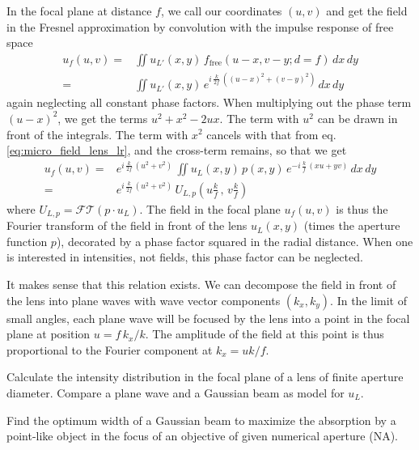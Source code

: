 In the focal plane at distance $f$, we call our coordinates $(u,v)$ and get the field in the Fresnel approximation by convolution with the impulse response of free space
\begin{align}
    u_f(u,v) = & \iint  u_{L'}(x,y) \, f_\text{free}( u - x, v - y; d = f)  \, dx \, dy \\
    = & \iint  u_{L'}(x,y)  \,
     e^{i \, \frac{k}{2f} \, ( ( u - x)^2 + (v -y)^2) } \, dx \, dy
\end{align}
again neglecting all constant phase factors. When multiplying out the phase term $(u-x)^2$, we get the terms $u^2 + x^2 - 2ux$. The term with $u^2$ can be drawn in front of the integrals. The term with $x^2$ cancels with that from eq.  \ref{eq:micro_field_lens_lr}, and the cross-term remains, so that we get
\begin{align}
    u_f(u,v) = & e^{i \, \frac{k}{2f} \, ( u^2 + v^2) } \,
    \iint  u_{L}(x,y) \, p(x,y) \,  e^{-i \,   \frac{k}{f} \, ( xu + yv) } \, dx \, dy \\
 = & e^{i \, \frac{k}{2f} \, ( u^2 + v^2) } \, U_{L,p} \left(u \frac{k}{f} \,  , \,  v \frac{k}{f} \right) \label{eq:micro_FT_lens_1}
\end{align}
where $U_{L,p} = \mathcal{FT} \left(p \cdot u_L   \right)$. The field in the focal plane $u_f(u,v)$ is thus the Fourier transform of the field in front of the lens $u_L(x,y)$ (times the aperture function $p$), decorated by a phase factor squared in the radial distance. When one is interested in intensities, not fields, this phase factor can be neglected.

It makes sense that this relation exists. We can decompose the field in front of the lens into plane waves with wave vector components $(k_x, k_y)$. In the limit of small angles, each plane wave will be focused by the lens into a point in the focal plane at  position $u = f \,  k_x / k$. The amplitude of the field at  this point is thus proportional to the Fourier component  at $k_x = u k / f$.


\begin{questions}
\item Calculate the intensity distribution in the focal plane of   a lens of finite aperture diameter. Compare  a plane wave and a Gaussian beam as model for $u_L$.

\item Find the optimum width of a Gaussian beam to maximize the absorption by a point-like object in the focus of an objective of given numerical aperture (NA).
\end{questions}



